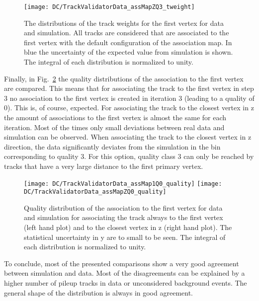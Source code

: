 \begin{figure}[h!t]
  \centering
  \texttt{[image: DC/TrackValidatorData\_assMapZQ3\_tweight]}
  \caption[Distributions of the track weights for the first vertex for data and simulation]{The distributions of the track weights for the first vertex for data and simulation. All tracks are considered that are associated to the first vertex with the default configuration of the association map. In blue the uncertainty of the expected value from simulation is shown. The integral of each distribution is normalized to unity. \label{plot:DCTVTW}}
\end{figure}

Finally, in Fig.~\ref{plot:DCTVTCQuality} the quality distributions of the association to the first vertex are compared. This means that for associating the track to the first vertex in step 3 no association to the first vertex is created in iteration 3 (leading to a quality of 0). This is, of course, expected. For associating the track to the closest vertex in z the amount of associations to the first vertex is almost the same for each iteration. Most of the times only small deviations between real data and simulation can be observed. When associating the track to the closest vertex in z direction, the data significantly deviates from the simulation in the bin corresponding to quality 3. For this option, quality class 3 can only be reached by tracks that have a very large distance to the first primary vertex.

\begin{figure}[h!t]
  \centering
  \texttt{[image: DC/TrackValidatorData\_assMap1Q0\_quality]}
  \texttt{[image: DC/TrackValidatorData\_assMapZQ0\_quality]}
  \caption[Quality distribution of the association to the first vertex for data and simulation]{Quality distribution of the association to the first vertex for data and simulation for associating the track always to the first vertex (left hand plot) and to the closest vertex in z (right hand plot). The statistical uncertainty in y are to small to be seen. The integral of each distribution is normalized to unity.\label{plot:DCTVTCQuality}}
\end{figure}

To conclude, most of the presented comparisons show a very good agreement between simulation and data. Most of the disagreements can be explained by a higher number of pileup tracks in data or unconsidered background events. The general shape of the distribution is always in good agreement. 

